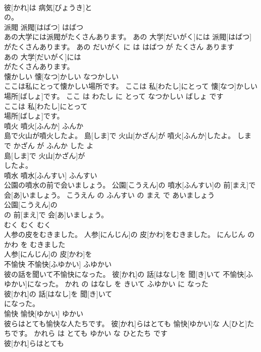 \documentclass[8pt]{extreport}
\begin{document}
\begin{CJK}{UTF8}{min}
\\	彼[かれ]は 病気[びょうき]と
\\	の。			
\\	派閥	派閥[はばつ]	はばつ	
\\	あの大学には派閥がたくさんあります。	あの 大学[だいがく]には 派閥[はばつ]がたくさんあります。	あの だいがく に は はばつ が たくさん あります	
\\	あの 大学[だいがく]には
\\	がたくさんあります。			
\\	懐かしい	懐[なつ]かしい	なつかしい	
\\	ここは私にとって懐かしい場所です。	ここは 私[わたし]にとって 懐[なつ]かしい 場所[ばしょ]です。	ここ は わたし に とって なつかしい ばしょ です	
\\	ここは 私[わたし]にとって
\\	場所[ばしょ]です。			
\\	噴火	噴火[ふんか]	ふんか	
\\	島で火山が噴火したよ。	島[しま]で 火山[かざん]が 噴火[ふんか]したよ。	しま で かざん が ふんか した よ	
\\	島[しま]で 火山[かざん]が
\\	したよ。			
\\	噴水	噴水[ふんすい]	ふんすい	
\\	公園の噴水の前で会いましょう。	公園[こうえん]の 噴水[ふんすい]の 前[まえ]で 会[あ]いましょう。	こうえん の ふんすい の まえ で あいましょう	
\\	公園[こうえん]の
\\	の 前[まえ]で 会[あ]いましょう。			
\\	むく	むく	むく	
\\	人参の皮をむきました。	人参[にんじん]の 皮[かわ]をむきました。	にんじん の かわ を むきました	
\\	人参[にんじん]の 皮[かわ]を
\\	不愉快	不愉快[ふゆかい]	ふゆかい	
\\	彼の話を聞いて不愉快になった。	彼[かれ]の 話[はなし]を 聞[き]いて 不愉快[ふゆかい]になった。	かれ の はなし を きいて ふゆかい に なった	
\\	彼[かれ]の 話[はなし]を 聞[き]いて
\\	になった。			
\\	愉快	愉快[ゆかい]	ゆかい	
\\	彼らはとても愉快な人たちです。	彼[かれ]らはとても 愉快[ゆかい]な 人[ひと]たちです。	かれら は とても ゆかい な ひとたち です	
\\	彼[かれ]らはとても

\end{CJK}
\end{document}
